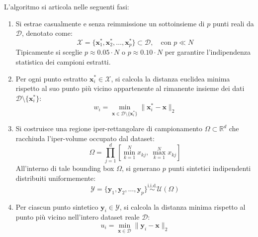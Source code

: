 L'algoritmo si articola nelle seguenti fasi:
\begin{enumerate}
    \item Si estrae casualmente e senza reimmissione un sottoinsieme di $p$ punti reali da $\mathcal{D}$, denotato come:
    \begin{equation}
    \label{eq:dm-hopkins-real-sample}
    \mathcal{X} = \{\mathbf{x}_1^*, \mathbf{x}_2^*, \dots, \mathbf{x}_p^*\} \subset \mathcal{D}, \quad \text{con } p \ll N
    \end{equation}
    Tipicamente si sceglie $p \approx 0.05 \cdot N$ o $p \approx 0.10 \cdot N$ per garantire l'indipendenza statistica dei campioni estratti.
    
    \item Per ogni punto estratto $\mathbf{x}_i^* \in \mathcal{X}$, si calcola la distanza euclidea minima rispetto al suo punto più vicino appartenente al rimanente insieme dei dati $\mathcal{D} \setminus \{\mathbf{x}_i^*\}$:
    \begin{equation}
    \label{eq:dm-hopkins-w-distance}
    w_i = \min_{\mathbf{x} \in \mathcal{D} \setminus \{\mathbf{x}_i^*\}} \|\mathbf{x}_i^* - \mathbf{x}\|_2
    \end{equation}
    
    \item Si costruisce una regione iper-rettangolare di campionamento $\Omega \subset \mathbb{R}^d$ che racchiuda l'iper-volume occupato dal dataset:
    \begin{equation}
    \label{eq:dm-hopkins-bounding-box}
    \Omega = \prod_{j=1}^d \left[\min_{k=1}^N x_{kj}, \ \max_{k=1}^N x_{kj}\right]
    \end{equation}
    All'interno di tale bounding box $\Omega$, si generano $p$ punti sintetici indipendenti distribuiti uniformemente:
    \begin{equation}
    \label{eq:dm-hopkins-synthetic-sample}
    \mathcal{Y} = \{\mathbf{y}_1, \mathbf{y}_2, \dots, \mathbf{y}_p\} \stackrel{\mathrm{i.i.d.}}{\sim} \mathcal{U}(\Omega)
    \end{equation}
    
    \item Per ciascun punto sintetico $\mathbf{y}_i \in \mathcal{Y}$, si calcola la distanza minima rispetto al punto più vicino nell'intero dataset reale $\mathcal{D}$:
    \begin{equation}
    \label{eq:dm-hopkins-u-distance}
    u_i = \min_{\mathbf{x} \in \mathcal{D}} \|\mathbf{y}_i - \mathbf{x}\|_2
    \end{equation}
    

\end{enumerate}
